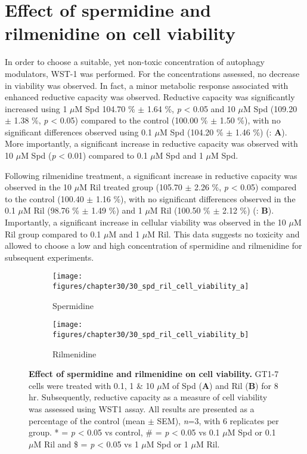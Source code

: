 \section{Effect of spermidine and rilmenidine on cell viability}
In order to choose a suitable, yet non-toxic concentration of autophagy modulators, WST-1 was performed. For the concentrations assessed, no decrease in viability was observed. In fact, a minor metabolic response associated with enhanced reductive capacity was observed. Reductive capacity was significantly increased using 1 $\mu$M Spd 104.70 \% $\pm$ 1.64 \%, \textit{p} < 0.05 and 10 $\mu$M Spd (109.20 $\pm$ 1.38 \%, \textit{p} < 0.05) compared to the control (100.00 \% $\pm$ 1.50 \%), with no significant differences observed using 0.1 $\mu$M Spd (104.20 \% $\pm$ 1.46 \%) (: \textbf{A}). More importantly, a significant increase in reductive capacity was observed with 10 $\mu$M Spd (\textit{p} < 0.01) compared to 0.1 $\mu$M Spd and 1 $\mu$M Spd.

Following rilmenidine treatment, a significant increase in reductive capacity was observed in the 10 $\mu$M Ril treated group (105.70 $\pm$ 2.26 \%, \textit{p} < 0.05) compared to the control (100.40 $\pm$ 1.16 \%), with no significant differences observed in the 0.1 $\mu$M Ril (98.76 \% $\pm$ 1.49 \%) and 1 $\mu$M Ril (100.50 \% $\pm$ 2.12 \%) (: \textbf{B}). Importantly, a significant increase in cellular viability was observed in the 10 $\mu$M Ril group compared to 0.1 $\mu$M and 1 $\mu$M Ril. This data suggests no toxicity and allowed to choose a low and high concentration of spermidine and rilmenidine for subsequent experiments.

\begin{figure}[!htbp]
  \centering
  \begin{subfigure}[b]{0.495\linewidth}
    \texttt{[image: figures/chapter30/30\_spd\_ril\_cell\_viability\_a]}
    \caption{Spermidine}
  \end{subfigure}
  \begin{subfigure}[b]{0.495\linewidth}
    \texttt{[image: figures/chapter30/30\_spd\_ril\_cell\_viability\_b]}
    \caption{Rilmenidine}
  \end{subfigure}
  \caption[Effect of spermidine and rilmenidine on cell viability]{\textbf{Effect of spermidine and rilmenidine on cell viability.} GT1-7 cells were treated with 0.1, 1 \& 10 $\mu$M of Spd (\textbf{A}) and Ril (\textbf{B}) for 8 hr. Subsequently, reductive capacity as a measure of cell viability was assessed using WST1 assay. All results are presented as a percentage of the control (mean $\pm$ SEM), \textit{n}=3, with 6 replicates per group. * = \textit{p} < 0.05 vs control, \# = \textit{p} < 0.05 vs 0.1 $\mu$M Spd or 0.1 $\mu$M Ril and \$ = \textit{p} < 0.05 vs 1 $\mu$M Spd or 1 $\mu$M Ril.}
  \label{fig:30_spd_ril_cell_viability_a}
\end{figure}

